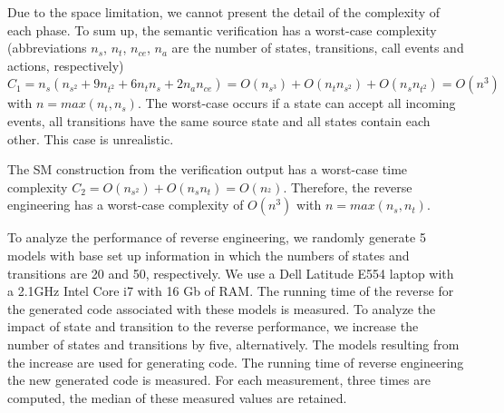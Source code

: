 Due to the space limitation, we cannot present the detail of the complexity of each phase. To sum up, the semantic verification has a worst-case complexity (abbreviations $n_{s}$, $n_{t}$, $n_{ce}$, $n_{a}$ are the number of states, transitions, call events and actions, respectively) $C_{1} = n_{s}(n_{s^2} + 9n_{t^2} + 6n_{t}n_{s} + 2n_{a}n_{ce}) = O (n_{s^3}) + O (n_{t}n_{s^2}) + O (n_{s}n_{t^2}) = O (n^3)$ with $n = max (n_{t}, n_{s})$. The worst-case occurs if a state can accept all incoming events, all transitions have the same source state and all states contain each other. This case is unrealistic.

The SM construction from the verification output has a worst-case time complexity $C_{2} = O (n_{s^2}) + O (n_{s} n_{t}) = O (n_{^2})$. Therefore, the reverse engineering has a worst-case complexity of $O (n^3)$ with $n = max (n_{s}, n_{t})$.

To analyze the performance of reverse engineering, we randomly generate 5 models with base set up information in which the numbers of states and transitions are 20 and 50, respectively. We use a Dell Latitude E554 laptop with a 2.1GHz Intel Core i7 with 16 Gb of RAM. The running time of the reverse for the generated code associated with these models is measured. To analyze the impact of state and transition to the reverse performance, 
we increase the number of states and transitions by five, alternatively. The models resulting from the increase are used for generating code. The running time of reverse engineering the new generated code is measured. For each measurement, three times are computed, the median of these measured values are retained. 

